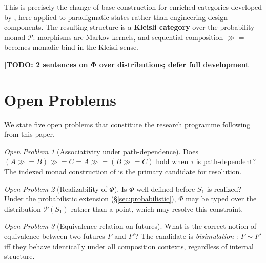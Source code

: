 \documentclass[11pt, a4paper]{article}
\theoremstyle{plain}
\theoremstyle{definition}
\theoremstyle{remark}
\newtheorem{openproblem}{Open Problem}
\newcommand{\bind}{\mathbin{\gg\!=}}          %
\newcommand{\Sone}{S_1}                        %
\newcommand{\traj}{\tau}                       %
\newcommand{\aff}{\Phi}                        %
\begin{document}
This is precisely the change-of-base construction for enriched categories
developed by \textcite{furter2025composable}, here applied to paradigmatic
states rather than engineering design components.
The resulting structure is a \textbf{Kleisli category} over the probability
monad $\mathcal{P}$: morphisms are Markov kernels, and sequential composition
$\bind$ becomes monadic bind in the Kleisli sense.


\textbf{[TODO: 2 sentences on Φ over distributions; defer full development]}

\section{Open Problems}
\label{sec:open}

We state five open problems that constitute the research programme
following from this paper.

\begin{openproblem}[Associativity under path-dependence]
\label{op:1}
Does $(A \bind B) \bind C = A \bind (B \bind C)$ hold when $\traj$ is
path-dependent?
The indexed monad construction of \textcite{orchard2014semantic} is the
primary candidate for resolution.
\end{openproblem}

\begin{openproblem}[Realizability of $\aff$]
\label{op:2}
Is $\aff$ well-defined before $\Sone$ is realized?
Under the probabilistic extension (\S\ref{sec:probabilistic}), $\aff$ may
be typed over the distribution $\mathcal{P}(\Sone)$ rather than a point,
which may resolve this constraint.
\end{openproblem}

\begin{openproblem}[Equivalence relation on futures]
\label{op:3}
What is the correct notion of equivalence between two futures $F$ and $F'$?
The candidate is \emph{bisimulation} \parencite{milner1989communication}:
$F \sim F'$ iff they behave identically under all composition contexts,
regardless of internal structure.
\end{openproblem}
\end{document}

